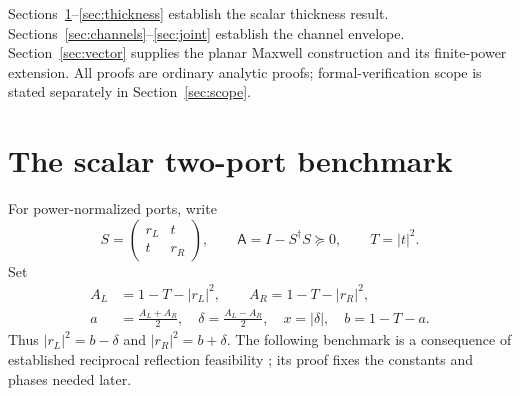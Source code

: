 \documentclass[11pt,a4paper]{article}
\theoremstyle{remark}
\newcommand{\abs}[1]{\lvert #1\rvert}
\begin{document}
Sections~\ref{sec:benchmark}--\ref{sec:thickness} establish the scalar thickness result. Sections~\ref{sec:channels}--\ref{sec:joint} establish the channel envelope. Section~\ref{sec:vector} supplies the planar Maxwell construction and its finite-power extension. All proofs are ordinary analytic proofs; formal-verification scope is stated separately in Section~\ref{sec:scope}.

\section{The scalar two-port benchmark}\label{sec:benchmark}
For power-normalized ports, write
\begin{equation}\label{eq:twoport}
 S=\begin{pmatrix}r_L&t\\t&r_R\end{pmatrix},\qquad
 \mathsf A=I-S^\dagger S\succeq0,\qquad T=\abs t^2.
\end{equation}
Set
\begin{equation}\label{eq:scalar-variables}
 \begin{aligned}
 A_L&=1-T-\abs{r_L}^2,\qquad A_R=1-T-\abs{r_R}^2,\\
 a&=\frac{A_L+A_R}{2},\quad \delta=\frac{A_L-A_R}{2},\quad
 x=\abs\delta,\quad b=1-T-a.
 \end{aligned}
\end{equation}
Thus $\abs{r_L}^2=b-\delta$ and $\abs{r_R}^2=b+\delta$. The following benchmark is a consequence of established reciprocal reflection feasibility \citep{GuoFan2022}; its proof fixes the constants and phases needed later.
\end{document}
